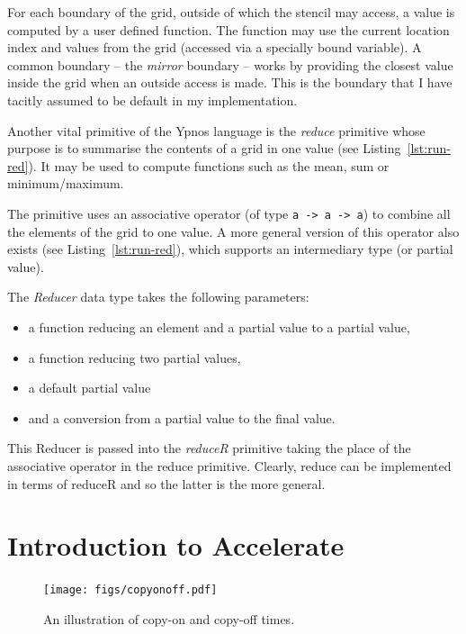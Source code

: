 \documentclass[
    12pt,
    a4paper,
    twoside,
    openright,
    ]{scrbook}
\begin{document}
For each boundary of the grid, outside of which the stencil may access, a value
is computed by a user defined function. The function may use the current
location index and values from the grid (accessed via a specially bound
variable). A common boundary -- the \emph{mirror} boundary -- works by providing
the closest value inside the grid when an outside access is made. This is the
boundary that I have tacitly assumed to be default in my implementation.

Another vital primitive of the Ypnos language is the \emph{reduce} primitive
whose purpose is to summarise the contents of a grid in one value (see
Listing~\ref{lst:run-red}). It may be used to compute functions such as the mean,
sum or minimum/maximum.

The primitive uses an associative operator (of type \texttt{a -\textgreater{} a
  -\textgreater{} a}) to combine all the elements of the grid to one value. A
more general version of this operator also exists (see
Listing~\ref{lst:run-red}), which supports an intermediary type (or partial
value).

The \emph{Reducer} data type takes the following parameters:

\begin{itemize}
\itemsep1pt\parskip0pt
\item
  a function reducing an element and a partial value to a partial value,
\item
  a function reducing two partial values,
\item
  a default partial value
\item
  and a conversion from a partial value to the final value.
\end{itemize}

This Reducer is passed into the \emph{reduceR} primitive taking the place of the
associative operator in the reduce primitive. Clearly, reduce can be implemented
in terms of reduceR and so the latter is the more general.

\section{Introduction to Accelerate}
\label{sec:intr-axle}

\begin{figure}
  \texttt{[image: figs/copyonoff.pdf]}
  \caption{An illustration of copy-on and copy-off times.  }
  \label{fig:copyonoff}
\end{figure}
\end{document}
